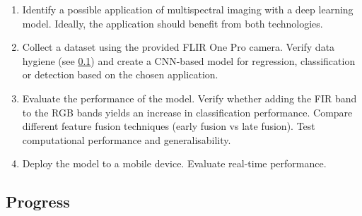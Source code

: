 \documentclass[11pt]{article}
\begin{document}
\begin{enumerate}
    \item Identify a possible application of multispectral imaging with a deep learning model. Ideally, the application should benefit from both technologies.
    \item Collect a dataset using the provided FLIR One Pro camera. Verify data hygiene (see \ref{progress}) and create a CNN-based model for regression, classification or detection based on the chosen application.
    \item Evaluate the performance of the model. Verify whether adding the FIR band to the RGB bands yields an increase in classification performance. Compare different feature fusion techniques (early fusion vs late fusion). Test computational performance and generalisability.
    \item Deploy the model to a mobile device. Evaluate real-time performance.
\end{enumerate}
\subsection{Progress}\label{progress}
\end{document}
